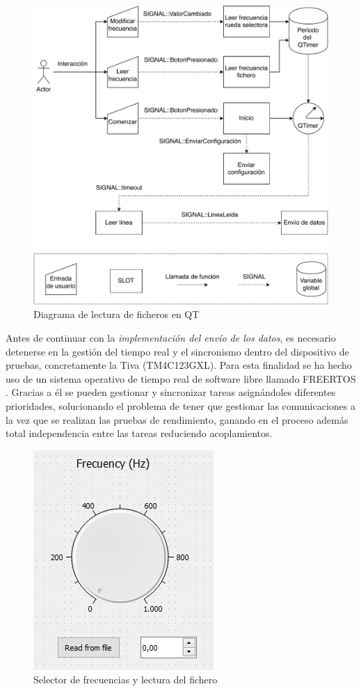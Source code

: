         \begin{figure} [H] 
                \centering
                        \includegraphics[width =\linewidth]{figuras/CompleteFileRead.pdf}
                \caption{Diagrama de lectura de ficheros en QT}
                \label{fig:CompleteFileRead}
        \end{figure}

        Antes de continuar con la \textit{implementación del envío de los datos}, es necesario detenerse en la gestión del tiempo real y el sincronismo dentro del dispositivo de pruebas, concretamente la Tiva (TM4C123GXL). Para esta finalidad se ha hecho uso de un sistema operativo de tiempo real de software libre llamado FREERTOS \cite{FreeRTOS}. Gracias a él se pueden gestionar y sincronizar tareas asignándoles diferentes prioridades, solucionando el problema de tener que gestionar las comunicaciones a la vez que se realizan las pruebas de rendimiento, ganando en el proceso además total independencia entre las tareas reduciendo acoplamientos.
        
        \begin{figure}[H]
                \centering
                        \includegraphics[width =0.4\linewidth]{figuras/FrecKnob.png}
                \caption{Selector de frecuencias y lectura del fichero}
                \label{fig:frecKnob}
        \end{figure}

